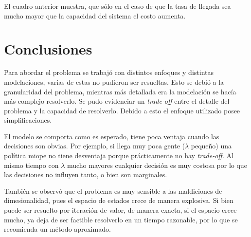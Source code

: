 \documentclass[letterpaper,10pt]{article}
\begin{document}
El cuadro anterior muestra, que sólo en el caso de que la tasa de llegada sea mucho mayor que la capacidad del sistema el costo aumenta.

\section*{Conclusiones}

Para abordar el problema se trabajó con distintos enfoques y distintas modelaciones, varias de estas no pudieron ser resueltas. Esto se debió a la granularidad del problema, mientras más detallada era la modelación se hacía más complejo resolverlo. Se pudo evidenciar un \textit{trade-off} entre el detalle del problema y la capacidad de resolverlo. Debido a esto el enfoque utilizado posee simplificaciones.

El modelo se comporta como es esperado, tiene poca ventaja cuando las decisiones son obvias. Por ejemplo, si llega muy poca gente ($\lambda$ pequeño) una política miope no tiene desventaja porque prácticamente no hay \textit{trade-off}. Al mismo tiempo con $\lambda$ mucho mayores cualquier decisión es muy costosa por lo que las decisiones no influyen tanto, o bien son marginales.

También se observó que el problema es muy sensible a las maldiciones de dimesionalidad, pues el espacio de estados crece de manera explosiva. Si bien puede ser resuelto por iteración de valor, de manera exacta, si el espacio crece mucho, ya deja de ser factible resolverlo en un tiempo razonable, por lo que se recomienda un método aproximado.


\small{
	
	
}
\end{document}
